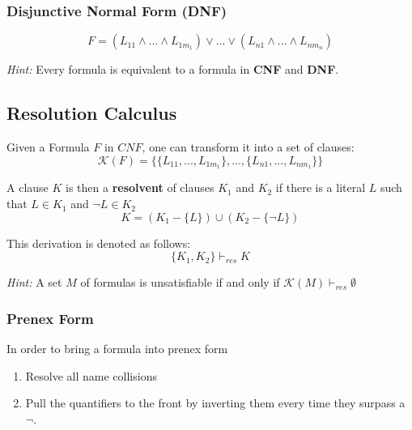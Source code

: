 \documentclass[11pt]{article}
\begin{document}
\subsubsection{Disjunctive Normal Form (DNF)}
\begin{equation*}
	F = (L_{11} \land ... \land L_{1m_1}) \lor ... \lor (L_{n1} \land ... \land L_{nm_n})
\end{equation*}

\emph{Hint:} Every formula is equivalent to a formula in \textbf{CNF} and \textbf{DNF}.

\subsection{Resolution Calculus}

Given a Formula $F$ in $CNF$, one can transform it into a set of clauses:
\begin{equation*}
	\mathcal{K}(F) = \{\{L_{11},...,L_{1m_1}\},...,\{L_{n1},...,L_{nm_1}\}\}
\end{equation*}

A clause $K$ is then a \textbf{resolvent} of clauses $K_1$ and $K_2$ if there is a literal $L$ such that $L \in K_1$ and $\neg L \in K_2$
\begin{equation*}
	K = (K_1 - \{L\}) \cup (K_2 - \{\neg L\})
\end{equation*}

This derivation is denoted as follows:
\begin{equation*}
	\{K_1, K_2\} \vdash_{res} K
\end{equation*}

\emph{Hint:} A set $M$ of formulas is unsatisfiable if and only if $\mathcal{K}(M) \vdash_{res} \emptyset$

\subsubsection{Prenex Form}

In order to bring a formula into prenex form
\begin{enumerate}[labelindent=16pt,style=multiline,leftmargin=1.5cm, noitemsep]
	\item Resolve all name collisions
	\item Pull the quantifiers to the front by inverting them every time they surpass a $\neg$.
\end{enumerate}
\end{document}
